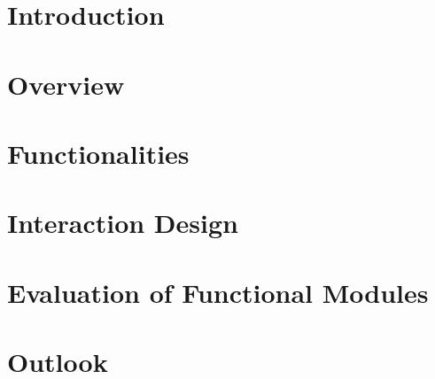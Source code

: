 \documentclass{article}
\begin{document}
	\section{Introduction}
	
	\section{Overview}
	
	\section{Functionalities}
	
	\section{Interaction Design}
	
	\section{Evaluation of Functional Modules}
	
	\section{Outlook}
	
	
\end{document}
